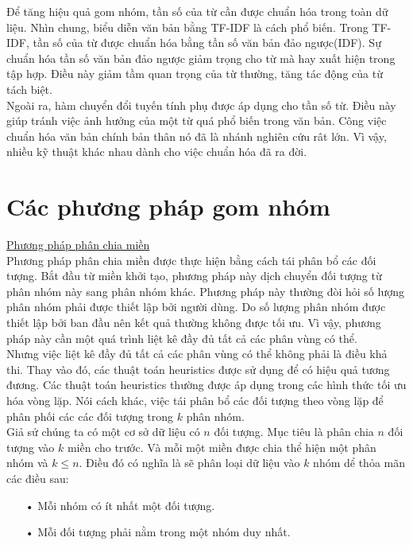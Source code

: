 \hspace*{10mm}Để tăng hiệu quả gom nhóm, tần số của từ cần được chuẩn hóa trong toàn dữ liệu. Nhìn chung, biểu diễn văn bản bằng TF-IDF là cách phổ biến. Trong TF-IDF, tần số của từ được chuẩn hóa bằng tần số văn bản đảo ngược(IDF). Sự chuẩn hóa tần số văn bản đảo ngược giảm trọng cho từ mà hay xuất hiện trong tập hợp. Điều này giảm tầm quan trọng của từ thường, tăng tác động của từ tách biệt.\\
\hspace*{10mm}Ngoài ra, hàm chuyển đổi tuyến tính phụ được áp dụng cho tần số từ. Điều này giúp tránh việc ảnh hưởng của một từ quá phổ biến trong văn bản. Công việc chuẩn hóa văn bản chính bản thân nó đã là nhánh nghiên cứu rât lớn. Vì vậy, nhiều kỹ thuật khác nhau dành cho việc chuẩn hóa đã ra đời.\\

\section{Các phương pháp gom nhóm}
\hspace{8mm}\underline{Phương pháp phân chia miền}\\
\hspace*{10mm}Phương pháp phân chia miền được thực hiện bằng cách tái phân bổ các đối tượng. Bắt đầu từ miền khởi tạo, phương pháp này dịch chuyển đối tượng từ phân nhóm này sang phân nhóm khác. Phương pháp này thường đòi hỏi số lượng phân nhóm phải được thiết lập bởi người dùng. Do số lượng phân nhóm được thiết lập bởi ban đầu nên kết quả thường không được tối ưu. Vì vậy, phương pháp này cần một quá trình liệt kê đầy đủ tất cả các phân vùng có thể. \\
\hspace*{10mm}Nhưng việc liệt kê đầy đủ tất cả các phân vùng có thể không phải là điều khả thi. Thay vào đó, các thuật toán heuristics được sử dụng để có hiệu quả tương đương. Các thuật toán heuristics thường được áp dụng trong các hình thức tối ưu hóa vòng lặp. Nói cách khác, việc tái phân bổ các đối tượng theo vòng lặp để phân phối các các đối tượng trong $k$ phân nhóm.\\
\hspace*{10mm}Giả sử chúng ta có một cơ sở dữ liệu có $n$ đối tượng.  Mục tiêu là phân chia $n$ đối tượng vào $k$ miền cho trước. Và mỗi một miền được chia thể hiện một phân nhóm và $k \leq n$. Điều đó có nghĩa là sẽ phân loại dữ liệu vào $k$ nhóm dể thỏa mãn các điều sau:\\
\begin{enumerate}
\vspace{-10mm}
\item[•]Mỗi nhóm có ít nhất một đối tượng.
\item[•]Mỗi đối tượng phải nằm trong một nhóm duy nhất.
\end{enumerate}

